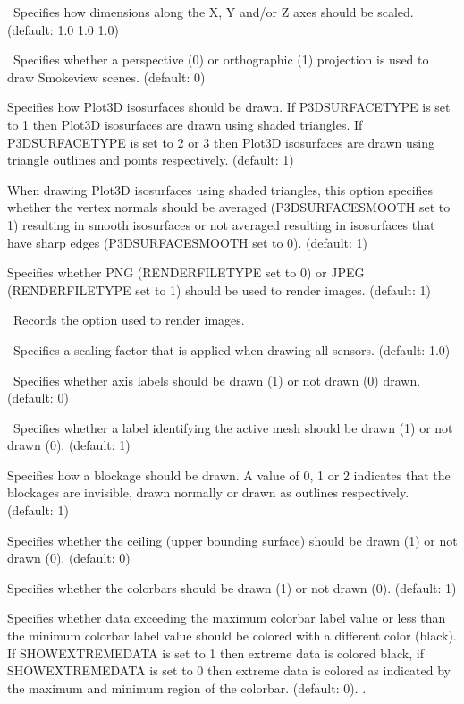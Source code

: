 \documentclass[11pt,twoside]{book}
\begin{document}
{\ Specifies how dimensions along the X, Y
and/or Z axes should be scaled. (default: 1.0 1.0 1.0)

\ Specifies whether a perspective (0) or orthographic (1) projection
is used to draw Smokeview scenes.
(default: 0)

Specifies how Plot3D isosurfaces should be
drawn.  If P3DSURFACETYPE is set to 1 then Plot3D isosurfaces are
drawn using shaded triangles.  If P3DSURFACETYPE is set to 2 or 3
then Plot3D isosurfaces are drawn using triangle outlines and
points respectively. (default: 1)

When drawing Plot3D isosurfaces using
shaded triangles, this option specifies whether the vertex normals
should be averaged (P3DSURFACESMOOTH set to 1) resulting in smooth
isosurfaces or not averaged resulting in isosurfaces that have
sharp edges (P3DSURFACESMOOTH set to 0). (default: 1)

Specifies whether PNG (RENDERFILETYPE set to 0) or
JPEG (RENDERFILETYPE set to 1)
should be used to render images.  (default: 1)

\ Records the option used to render images.

\ Specifies a scaling factor that is applied when
drawing all sensors.  (default: 1.0)

\ Specifies whether axis labels should
be drawn (1) or not drawn (0) drawn. (default: 0)

\ Specifies whether a label identifying the
active mesh should be drawn (1) or not drawn (0). (default: 1)

Specifies how a blockage should
be drawn.  A value of 0, 1 or 2 indicates that the blockages are
invisible, drawn normally or drawn as outlines respectively.  (default: 1)

Specifies whether
the ceiling (upper bounding surface) should be drawn (1) or not drawn (0).
(default: 0)


Specifies whether
the colorbars should be drawn (1) or not drawn (0).
(default: 1)

Specifies whether data exceeding the maximum colorbar
label value or less than the minimum colorbar label value should be colored
with a different color (black).  If SHOWEXTREMEDATA is set to 1 then extreme
data is colored black, if SHOWEXTREMEDATA is set to 0 then extreme data is
colored as indicated by the maximum and minimum region of the colorbar. (default: 0).  .

}
\end{document}
